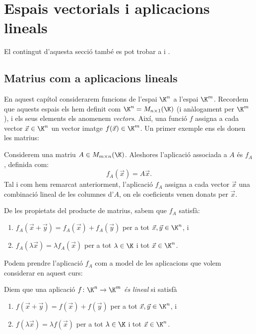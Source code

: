 \section{Espais vectorials i aplicacions lineals} 
El contingut d'aquesta secció també es pot trobar a \cite[Secció 2.2]{Bret} i \cite[Temes 2, 3, 4]{NaXa}.


\subsection{Matrius com a aplicacions lineals}\label{subsec:matriusapl}
En aquest capítol considerarem funcions de l'espai $\K^n$ a l'espai $\K^m$. Recordem que aquests espais els hem definit com $\K^n=M_{n\times 1}(\K)$ (i anàlogament per $\K^m$), i els seus elements els anomenem \emph{vectors}. Així, una funció $f$ assigna a cada vector $\vec x\in \K^n$ un vector imatge $f(\vec x)\in \K^m$. Un primer exemple ens els donen les matrius:

\begin{exemple}\label{exemple:Alineal}
	Considerem una matriu $A\in M_{m\times n}(\K)$. Aleshores l'aplicació associada a $A$ és $f_A$, definida com:
	\[
	f_A(\vec x) = A\vec x.
	\]
	Tal i com hem remarcat anteriorment, l'aplicació $f_A$ assigna a cada vector $\vec x$ una combinació lineal de les columnes d'$A$, on els coeficients venen donats per $\vec x$.
	
	De les propietats del producte de matrius, sabem que $f_A$ satisfà:
	\begin{enumerate}
		\item $f_A(\vec x+\vec y) = f_A(\vec x) + f_A(\vec y)$ per a tot $\vec x, \vec y \in \K^n$, i
		\item $f_A(\lambda \vec x) = \lambda f_A(\vec x)$ per a tot $\lambda\in\K$ i tot $\vec x\in \K^n$.
	\end{enumerate}
\end{exemple}
Podem prendre l'aplicació $f_A$ com a model de les aplicacions que volem considerar en aquest curs:

\begin{definicio}\label{def:aplicaciolinealKn}
	Diem que una aplicació $f\colon \K^n\to \K^m$ \emph{és lineal} si satisfà
	\begin{enumerate}
		\item $f(\vec x+\vec y) = f(\vec x) + f(\vec y)$ per a tot $\vec x, \vec y \in \K^n$, i
		\item $f(\lambda \vec x) = \lambda f(\vec x)$ per a tot $\lambda\in\K$ i tot $\vec x\in \K^n$.
	\end{enumerate}
\end{definicio}

